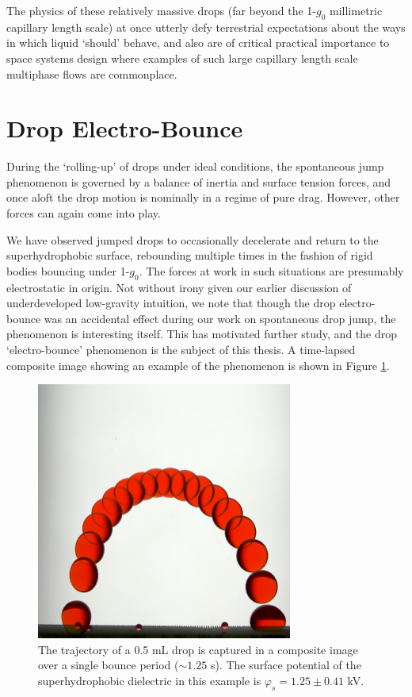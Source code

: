 \documentclass[12pt,a4paper,oneside]{book}
\begin{document}
The physics of these relatively massive drops (far beyond the 1-$g_0$ millimetric capillary length scale) at once utterly defy terrestrial expectations about the ways in which liquid `should' behave, and also are of critical practical importance to space systems design where examples of such large capillary length scale multiphase flows are commonplace.

\section{Drop Electro-Bounce}
During the `rolling-up' of drops under ideal conditions, the spontaneous jump phenomenon is governed by a balance of inertia and surface tension forces, and once aloft the drop motion is nominally in a regime of pure drag. However, other forces can again come into play. 

We have observed jumped drops to occasionally decelerate and return to the superhydrophobic surface, rebounding multiple times in the fashion of rigid bodies bouncing under 1-$g_0$. The forces at work in such situations are presumably electrostatic in origin. Not without irony given our earlier discussion of underdeveloped low-gravity intuition, we note that though the drop electro-bounce was an accidental effect during our work on spontaneous drop jump, the phenomenon is interesting itself. This has motivated further study, and the drop `electro-bounce' phenomenon is the subject of this thesis. A time-lapsed composite image showing an example of the phenomenon is shown in Figure \ref{fig:bounce}.
\begin{figure}[htb]
\centering
\includegraphics[width=0.75\textwidth]{bounce}
\caption{The trajectory of a 0.5 mL drop is captured in a composite image over a single bounce period ($\sim 1.25$ s). The surface potential of the superhydrophobic dielectric in this example is $\varphi_s = 1.25 \pm 0.41$ kV. \label{fig:bounce}}
\end{figure}
\end{document}

